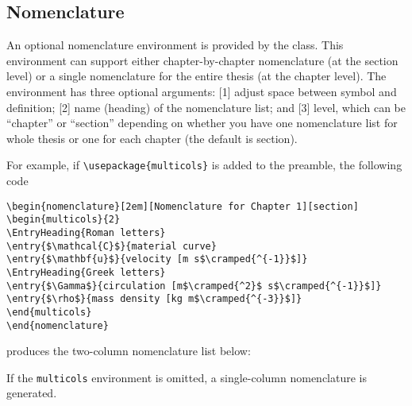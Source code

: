 \documentclass[11pt]{article}
\begin{document}
\subsection{Nomenclature}
An optional nomenclature environment is provided by the class.  This environment can support either chapter-by-chapter nomenclature (at the section level) or a single nomenclature for the entire thesis (at the chapter level). The environment has three optional arguments: [1] adjust space between symbol and definition; [2] name (heading) of the nomenclature list; and [3] level, which can be ``chapter'' or ``section'' depending on whether you
have one nomenclature list for whole thesis or one for each chapter (the default is section). 

For example, if \verb+\usepackage{multicols}+ is added to the preamble, the following code 
\begin{center}
\begin{minipage}{0.85\textwidth}
\begin{verbatim}
\begin{nomenclature}[2em][Nomenclature for Chapter 1][section]
\begin{multicols}{2}
\EntryHeading{Roman letters}
\entry{$\mathcal{C}$}{material curve}
\entry{$\mathbf{u}$}{velocity [m s$\cramped{^{-1}}$]}
\EntryHeading{Greek letters}
\entry{$\Gamma$}{circulation [m$\cramped{^2}$ s$\cramped{^{-1}}$]}
\entry{$\rho$}{mass density [kg m$\cramped{^{-3}}$]}
\end{multicols}
\end{nomenclature}
\end{verbatim}
\end{minipage}
\end{center}
produces the two-column nomenclature list below:

\begin{nomenclature}
\begin{multicols}{2}
\end{multicols}
\end{nomenclature}
If the \texttt{multicols} environment is omitted, a single-column nomenclature is generated.
\end{document}
